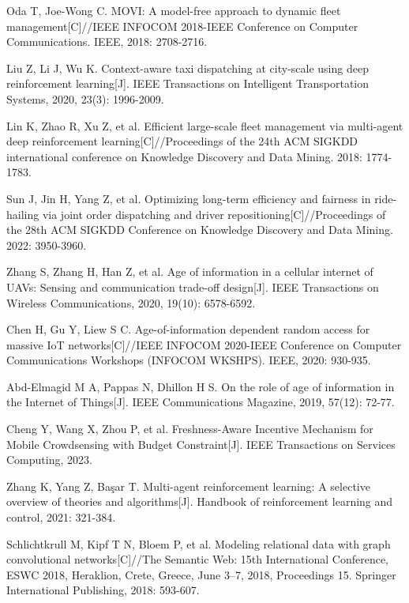 \begin{thebibliography}{00}
 Oda T, Joe-Wong C. MOVI: A model-free approach to dynamic fleet management[C]//IEEE INFOCOM 2018-IEEE Conference on Computer Communications. IEEE, 2018: 2708-2716.

 Liu Z, Li J, Wu K. Context-aware taxi dispatching at city-scale using deep reinforcement learning[J]. IEEE Transactions on Intelligent Transportation Systems, 2020, 23(3): 1996-2009.

 Lin K, Zhao R, Xu Z, et al. Efficient large-scale fleet management via multi-agent deep reinforcement learning[C]//Proceedings of the 24th ACM SIGKDD international conference on Knowledge Discovery and Data Mining. 2018: 1774-1783.

 Sun J, Jin H, Yang Z, et al. Optimizing long-term efficiency and fairness in ride-hailing via joint order dispatching and driver repositioning[C]//Proceedings of the 28th ACM SIGKDD Conference on Knowledge Discovery and Data Mining. 2022: 3950-3960.

 Zhang S, Zhang H, Han Z, et al. Age of information in a cellular internet of UAVs: Sensing and communication trade-off design[J]. IEEE Transactions on Wireless Communications, 2020, 19(10): 6578-6592.

 Chen H, Gu Y, Liew S C. Age-of-information dependent random access for massive IoT networks[C]//IEEE INFOCOM 2020-IEEE Conference on Computer Communications Workshops (INFOCOM WKSHPS). IEEE, 2020: 930-935.

 Abd-Elmagid M A, Pappas N, Dhillon H S. On the role of age of information in the Internet of Things[J]. IEEE Communications Magazine, 2019, 57(12): 72-77.

 Cheng Y, Wang X, Zhou P, et al. Freshness-Aware Incentive Mechanism for Mobile Crowdsensing with Budget Constraint[J]. IEEE Transactions on Services Computing, 2023.

Zhang K, Yang Z, Başar T. Multi-agent reinforcement learning: A selective overview of theories and algorithms[J]. Handbook of reinforcement learning and control, 2021: 321-384.

 Schlichtkrull M, Kipf T N, Bloem P, et al. Modeling relational data with graph convolutional networks[C]//The Semantic Web: 15th International Conference, ESWC 2018, Heraklion, Crete, Greece, June 3–7, 2018, Proceedings 15. Springer International Publishing, 2018: 593-607.


\end{thebibliography}
